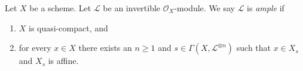 \begin{definition}
\label{definition-ample}
\begin{reference}
\cite[II Definition 4.5.3]{EGA}
\end{reference}
Let $X$ be a scheme.
Let $\mathcal{L}$ be an invertible $\mathcal{O}_X$-module.
We say $\mathcal{L}$ is {\it ample} if
\begin{enumerate}
\item $X$ is quasi-compact, and
\item for every $x \in X$ there exists an $n \geq 1$
and $s \in \Gamma(X, \mathcal{L}^{\otimes n})$ such
that $x \in X_s$ and $X_s$ is affine.
\end{enumerate}
\end{definition}